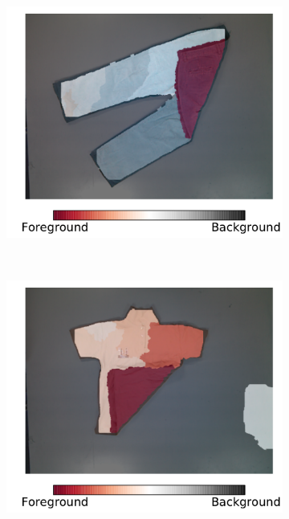 \begin{figure}[htbp]
	~
	\begin{subfigure}[l]{0.49\textwidth}
	    \centering
    	\includegraphics[width=\textwidth]
    	{figures/clustering/pants3-clustering.pdf}
	\end{subfigure}
	~
    \begin{subfigure}[r]{0.49\textwidth}
	    \centering
    	\includegraphics[width=\textwidth]
    	{figures/clustering/polo6-clustering.pdf}
	\end{subfigure}
	~
	\begin{subfigure}[l]{0.49\textwidth}

\end{subfigure}
\end{figure}
